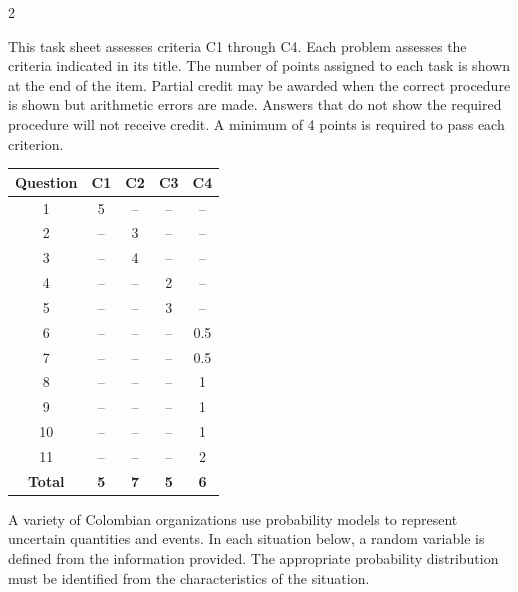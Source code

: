 	\begin{multicols}{2}
		
		This task sheet assesses criteria C1 through C4. Each problem assesses
		the criteria indicated in its title. The number of points assigned to
		each task is shown at the end of the item. Partial credit may be awarded
		when the correct procedure is shown but arithmetic errors are made.
		Answers that do not show the required procedure will not receive credit.
		A minimum of 4 points is required to pass each criterion.
		
		\vspace*{-4mm}
		\begin{center}
			\begin{tabular}{|c|c|c|c|c|}
				\hline
				\textbf{Question} & \textbf{C1} & \textbf{C2} & \textbf{C3} & \textbf{C4} \\ \hline
				1 & 5 & -- & -- & -- \\ \hline
				2 & -- & 3 & -- & -- \\ \hline
				3 & -- & 4 & -- & -- \\ \hline
				4 & -- & -- & 2 & -- \\ \hline
				5 & -- & -- & 3 & -- \\ \hline
				6 & -- & -- & -- & 0.5 \\ \hline
				7 & -- & -- & -- & 0.5 \\ \hline
				8 & -- & -- & -- & 1 \\ \hline
				9 & -- & -- & -- & 1 \\ \hline
				10 & -- & -- & -- & 1 \\ \hline
				11 & -- & -- & -- & 2 \\ \hline
				\textbf{Total} & \textbf{5} & \textbf{7} & \textbf{5} & \textbf{6} \\ \hline
			\end{tabular}
		\end{center}
		\vspace*{-6mm}
		
		{
		A variety of Colombian organizations use probability models to represent
		uncertain quantities and events. In each situation below, a random
		variable is defined from the information provided. The appropriate
		probability distribution must be identified from the characteristics
		of the situation.
		
}
\end{multicols}
